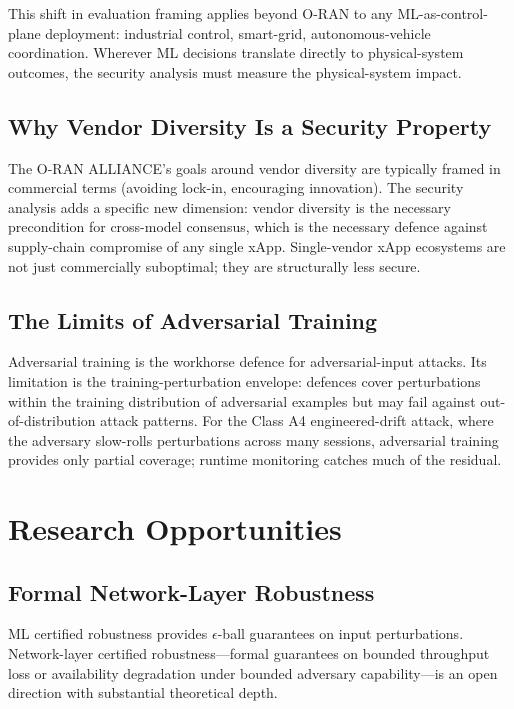 \documentclass[sigconf,nonacm]{acmart}
\begin{document}
This shift in evaluation framing applies beyond O-RAN to any
ML-as-control-plane deployment: industrial control, smart-grid,
autonomous-vehicle coordination. Wherever ML decisions translate
directly to physical-system outcomes, the security analysis must
measure the physical-system impact.

\subsection{Why Vendor Diversity Is a Security Property}

The O-RAN ALLIANCE's goals around vendor diversity are
typically framed in commercial terms (avoiding lock-in,
encouraging innovation). The security analysis adds a specific
new dimension: vendor diversity is the necessary precondition
for cross-model consensus, which is the necessary defence
against supply-chain compromise of any single xApp.
Single-vendor xApp ecosystems are not just commercially
suboptimal; they are structurally less secure.

\subsection{The Limits of Adversarial Training}

Adversarial training is the workhorse defence for adversarial-input
attacks. Its limitation is the training-perturbation envelope:
defences cover perturbations within the training distribution
of adversarial examples but may fail against
out-of-distribution attack patterns. For the Class A4
engineered-drift attack, where the adversary slow-rolls
perturbations across many sessions, adversarial training
provides only partial coverage; runtime monitoring catches
much of the residual.

\section{Research Opportunities}

\subsection{Formal Network-Layer Robustness}

ML certified robustness provides $\epsilon$-ball guarantees on
input perturbations. Network-layer certified robustness---formal
guarantees on bounded throughput loss or availability degradation
under bounded adversary capability---is an open direction with
substantial theoretical depth.
\end{document}
